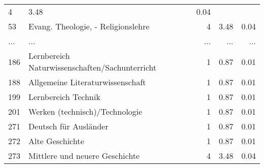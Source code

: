 \begin{longtable}{lXrrr}
          \num{4} &
          \num[round-mode=places,round-precision=2]{3.48} &
          \num[round-mode=places,round-precision=2]{0.04} \\
        53 & \multicolumn{1}{X}{Evang. Theologie, - Religionslehre} & %
          \num{4} &
          \num[round-mode=places,round-precision=2]{3.48} &
          \num[round-mode=places,round-precision=2]{0.04} \\
       ... & ... & ... & ... & ... \\
        186 & \multicolumn{1}{X}{Lernbereich Naturwissenschaften/Sachunterricht} & %
          \num{1} &
          \num[round-mode=places,round-precision=2]{0.87} &
          \num[round-mode=places,round-precision=2]{0.01} \\

        188 & \multicolumn{1}{X}{Allgemeine Literaturwissenschaft} & %
          \num{1} &
          \num[round-mode=places,round-precision=2]{0.87} &
          \num[round-mode=places,round-precision=2]{0.01} \\

        199 & \multicolumn{1}{X}{Lernbereich Technik} & %
          \num{1} &
          \num[round-mode=places,round-precision=2]{0.87} &
          \num[round-mode=places,round-precision=2]{0.01} \\

        201 & \multicolumn{1}{X}{Werken (technisch)/Technologie} & %
          \num{1} &
          \num[round-mode=places,round-precision=2]{0.87} &
          \num[round-mode=places,round-precision=2]{0.01} \\

        271 & \multicolumn{1}{X}{Deutsch für Ausländer} & %
          \num{1} &
          \num[round-mode=places,round-precision=2]{0.87} &
          \num[round-mode=places,round-precision=2]{0.01} \\

        272 & \multicolumn{1}{X}{Alte Geschichte} & %
          \num{1} &
          \num[round-mode=places,round-precision=2]{0.87} &
          \num[round-mode=places,round-precision=2]{0.01} \\

        273 & \multicolumn{1}{X}{Mittlere und neuere Geschichte} & %
          \num{4} &
          \num[round-mode=places,round-precision=2]{3.48} &
          \num[round-mode=places,round-precision=2]{0.04} \\


\end{longtable}
